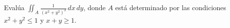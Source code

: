 Evalúa \(\iint_A \frac{1}{\left(x^2 + y^2\right)^2} \, dx \, dy\), donde \( A \) está determinado por las condiciones \( x^2 + y^2 \leq 1 \) y \( x + y \geq 1 \).
